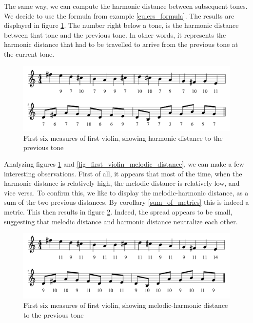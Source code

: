 \documentclass[a4paper]{book}
\theoremstyle{definition}
\begin{document}
The same way, we can compute the harmonic distance between subsequent tones.
We decide to use the formula from example \ref{eulers_formula}.
The results are displayed in figure \ref{fig_first_violin_harmonic_distance}.
The number right below a tone, is the harmonic distance between that tone and the previous tone.
In other words, it represents the harmonic distance that had to be travelled to arrive from the previous tone at the current tone.

\begin{figure}[H]
    \centering
    \includegraphics[scale=0.25]{figures/fig_first_violin_harmonic_distance.png}
    \caption{First six measures of first violin, showing harmonic distance to the previous tone}
    \label{fig_first_violin_harmonic_distance}
\end{figure}

Analyzing figures \ref{fig_first_violin_harmonic_distance} and \ref{fig_first_violin_melodic_distance}, we can make a few interesting observations.
First of all, it appears that most of the time, when the harmonic distance is relatively high, the melodic distance is relatively low, and vice versa.
To confirm this, we like to display the melodic-harmonic distance, as a sum of the two previous distances.
By corollary \ref{sum_of_metrics} this is indeed a metric.
This then results in figure \ref{fig_first_violin_melodic_harmonic_distance}.
Indeed, the spread appears to be small, suggesting that melodic distance and harmonic distance neutralize each other.

\begin{figure}[H]
    \centering
    \includegraphics[scale=0.25]{figures/fig_first_violin_melodic_harmonic_distance.png}
    \caption{First six measures of first violin, showing melodic-harmonic distance to the previous tone}
    \label{fig_first_violin_melodic_harmonic_distance}
\end{figure}
\end{document}
